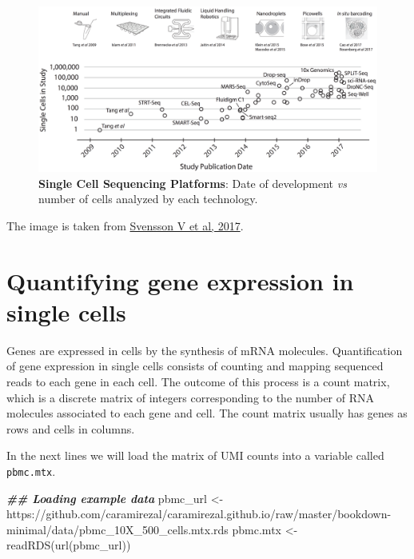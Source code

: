 \documentclass[
]{book}
\newenvironment{Shaded}{\begin{snugshade}}{\end{snugshade}}
\newcommand{\DocumentationTok}[1]{\textcolor[rgb]{0.56,0.35,0.01}{\textbf{\textit{#1}}}}
\newcommand{\FunctionTok}[1]{\textcolor[rgb]{0.00,0.00,0.00}{#1}}
\newcommand{\NormalTok}[1]{#1}
\newcommand{\OtherTok}[1]{\textcolor[rgb]{0.56,0.35,0.01}{#1}}
\newcommand{\StringTok}[1]{\textcolor[rgb]{0.31,0.60,0.02}{#1}}
\begin{document}
\begin{figure}
\centering
\includegraphics{figures/moores-law.png}
\caption{\textbf{Single Cell Sequencing Platforms}: Date of development \emph{vs} number of cells analyzed by each technology.}
\end{figure}

The image is taken from \href{https://arxiv.org/abs/1704.01379}{Svensson V et al, 2017}.

\hypertarget{quantifying-gene-expression-in-single-cells}{%
\section{Quantifying gene expression in single cells}\label{quantifying-gene-expression-in-single-cells}}

Genes are expressed in cells by the synthesis of mRNA molecules. Quantification of gene expression
in single cells consists of counting and mapping sequenced reads to each gene in each cell. The
outcome of this process is a count matrix, which is a discrete matrix of integers corresponding
to the number of RNA molecules associated to each gene and cell. The count matrix usually has
genes as rows and cells in columns.

In the next lines we will load the matrix of UMI counts into a variable called \texttt{pbmc.mtx}.

\begin{Shaded}
\begin{Highlighting}[]
\DocumentationTok{\#\# Loading example data}
\NormalTok{pbmc\_url  }\OtherTok{\textless{}{-}} \StringTok{\textquotesingle{}https://github.com/caramirezal/caramirezal.github.io/raw/master/bookdown{-}minimal/data/pbmc\_10X\_500\_cells.mtx.rds\textquotesingle{}}
\NormalTok{pbmc.mtx }\OtherTok{\textless{}{-}} \FunctionTok{readRDS}\NormalTok{(}\FunctionTok{url}\NormalTok{(pbmc\_url))}
\end{Highlighting}
\end{Shaded}
\end{document}
